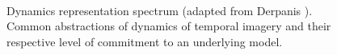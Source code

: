 \begin{figure}[t]
\begin{center}
	\\
	\caption[Dynamics representation spectrum]{Dynamics representation spectrum (adapted from Derpanis \cite{derpanis2010role}). Common abstractions of dynamics of temporal imagery and their respective level of commitment to an underlying model.}
	\vspace{-0.65cm}
	\label{fig:dynamics_representations}
\end{center}
\end{figure}